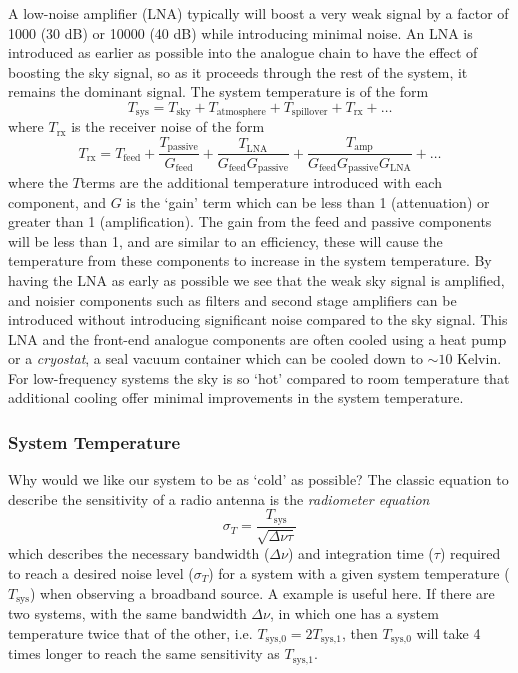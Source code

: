 \documentclass[usenatbib,usegraphicx]{article}
\begin{document}
A low-noise amplifier (LNA) typically will boost a very weak signal by a factor of 1000 (30 dB) or 10000 (40 dB) while introducing minimal noise.
An LNA is introduced as earlier as possible into the analogue chain to have the effect of boosting the sky signal, so as it proceeds through the rest of the system, it remains the dominant signal.
The system temperature is of the form
%
\begin{equation}
\label{eq:system_temp}
T_{\textrm{sys}} = T_{\textrm{sky}} + T_{\textrm{atmosphere}} + T_{\textrm{spillover}} + T_{\textrm{rx}} + \ldots
\end{equation}
%
where $T_{\textrm{rx}}$ is the receiver noise of the form
\begin{equation}
\label{eq:rx_temp}
T_{\textrm{rx}} = T_{\textrm{feed}} + \frac{T_{\textrm{passive}}}{G_{\textrm{feed}}} + \frac{T_{\textrm{LNA}}}{G_{\textrm{feed}} G_{\textrm{passive}}} + \frac{T_{\textrm{amp}}}{G_{\textrm{feed}} G_{\textrm{passive}} G_{\textrm{LNA}}} + \ldots
\end{equation}
%
where the $T$terms are the additional temperature introduced with each component, and $G$ is the `gain' term which can be less than 1 (attenuation) or greater than 1 (amplification).
The gain from the feed and passive components will be less than 1, and are similar to an efficiency, these will cause the temperature from these components to increase in the system temperature.
By having the LNA as early as possible we see that the weak sky signal is amplified, and noisier components such as filters and second stage amplifiers can be introduced without introducing significant noise compared to the sky signal.
This LNA and the front-end analogue components are often cooled using a heat pump or a \emph{cryostat}, a seal vacuum container which can be cooled down to $\sim 10$ Kelvin.
For low-frequency systems the sky is so `hot' compared to room temperature that additional cooling offer minimal improvements in the system temperature.

\subsubsection{System Temperature}

Why would we like our system to be as `cold' as possible?
The classic equation to describe the sensitivity of a radio antenna is the \emph{radiometer equation}
%
\begin{equation}
\label{eq:rediometer}
\sigma_{T} = \frac{T_{\textrm{sys}}}{\sqrt{\Delta\nu \tau}}
\end{equation}
%
which describes the necessary bandwidth ($\Delta \nu$) and integration time ($\tau$) required to reach a desired noise level ($\sigma_{T}$) for a system with a given system temperature ($T_{\textrm{sys}}$) when observing a broadband source.
A example is useful here.
If there are two systems, with the same bandwidth $\Delta \nu$, in which one has a system temperature twice that of the other, i.e. $T_{\textrm{sys,0}} = 2 T_{\textrm{sys,1}}$, then $T_{\textrm{sys,0}}$ will take 4 times longer to reach the same sensitivity as $T_{\textrm{sys,1}}$.
\end{document}
